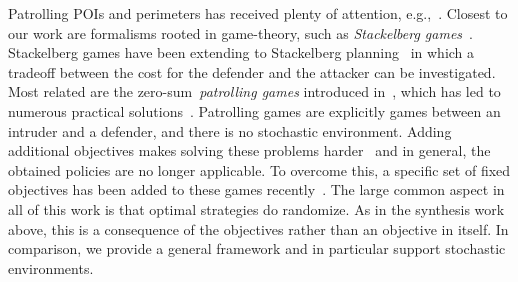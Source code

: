 Patrolling POIs and perimeters has received plenty of attention, e.g.,~\cite{DBLP:conf/icra/AgmonKK08,DBLP:conf/icra/AmigoniBG09,DBLP:conf/iros/PortugalPRC14}.  
Closest to our work are  formalisms rooted in game-theory,  such as  \emph{Stackelberg games}~\cite{simaan1973stackelberg,DBLP:conf/atal/ParuchuriPTOK07}. Stackelberg games have been extending to Stackelberg planning~\cite{DBLP:conf/aaai/SpeicherS00K18} in which a tradeoff between the cost for the defender and the attacker can be investigated.
Most related are the zero-sum~\emph{patrolling games} introduced in~\cite{DBLP:journals/ior/AlpernMP11}, which has led to numerous practical solutions~\cite{DBLP:books/daglib/0040483}. Patrolling games are explicitly games between an intruder and a defender, and there is no stochastic environment.  Adding additional objectives makes solving these problems harder~\cite{DBLP:conf/atal/Klaska0R20} and in general, the obtained policies are no longer applicable. To overcome this, a specific set of fixed objectives has been added to these games recently~\cite{DBLP:conf/atal/Klaska0R20}. 
 The large common aspect in all of this work is that optimal strategies do randomize. As in the synthesis work above, this is a consequence of the objectives rather than an objective in itself. 
 In comparison, we provide a general framework and in particular support stochastic environments.
 
